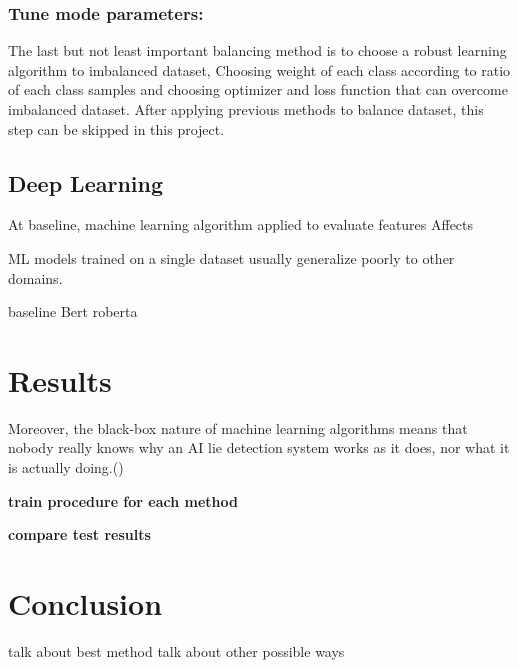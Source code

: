 \subsubsection{\textbf{Tune mode parameters:}}
 The last but not least important balancing method is to choose a robust learning algorithm to imbalanced dataset, Choosing weight of each class according to ratio of each class samples and choosing optimizer and loss function that can overcome imbalanced dataset. After applying previous methods to balance dataset, this step can be skipped in this project. 




\subsection{Deep Learning}
At baseline, machine learning algorithm applied to evaluate features Affects 

\cite{stance_robust}ML models trained on a single dataset usually generalize poorly to other
domains.

baseline 
\newline
Bert
\newline
roberta
\section{Results}
Moreover, the black-box nature of
machine learning algorithms means that nobody really knows why an AI lie
detection system works as it does, nor what it is actually doing.(\cite{book_fake})

\textbf{train procedure for each method}

\textbf{compare test results}

\section{Conclusion}
talk about best method
\newline
talk about other possible ways
